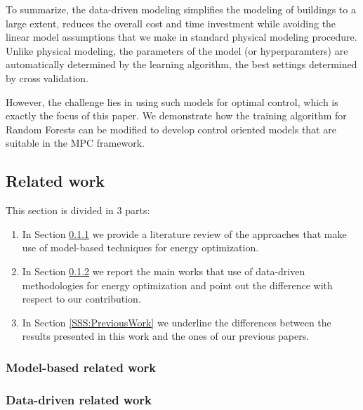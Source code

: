 To summarize, the data-driven modeling simplifies the modeling of buildings to a large extent, reduces the overall cost and time investment while avoiding the linear model assumptions that we make in standard physical modeling procedure. Unlike physical modeling, the parameters of the model (or hyperparamters) are automatically determined by the learning algorithm, the best settings determined by cross validation.

However, the challenge lies in using such models for optimal control, which is exactly the focus of this paper.
We demonstrate how the training algorithm for Random Forests can be modified to develop control oriented models that are suitable in the MPC framework.

\textcolor[rgb]{0,0,1}{
\subsection{Related work}
This section is divided in 3 parts:
\begin{enumerate}
	\item In Section \ref{SSS:ModelBasedWork} we provide a literature review of the approaches that make use of model-based techniques for energy optimization.
	\item In Section \ref{SSS:DataDrivenWork} we report the main works that use of data-driven methodologies for energy optimization and point out the difference with respect to our contribution.
	\item In Section \ref{SSS:PreviousWork} we underline the differences between the results presented in this work and the ones of our previous papers.
\end{enumerate}
\subsubsection{Model-based related work}\label{SSS:ModelBasedWork}
\subsubsection{Data-driven related work}\label{SSS:DataDrivenWork}}
